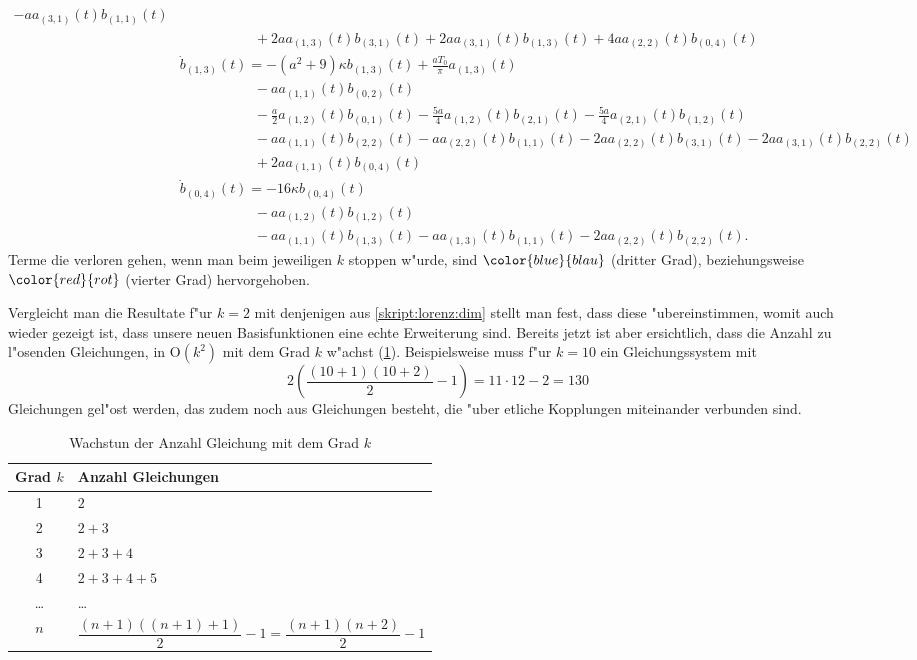 \begin{align*}
-
a
a_{(3,1)}(t) b_{(1,1)}(t)
\\
&\phantom{aaaaaaaaaa}
+
2 a
a_{(1,3)}(t) b_{(3,1)}(t)
+
2 a
a_{(3,1)}(t) b_{(1,3)}(t)
+
4 a
a_{(2,2)}(t) b_{(0,4)}(t)
\\
&
\dot{b}_{(1,3)}(t)
=
-
(a^2+9)
\kappa
b_{(1,3)}(t)
+
\frac{a T_{0}}{\pi} a_{(1,3)}(t)
\\
&\phantom{aaaaaaaaaa}
-
a
a_{(1,1)}(t) b_{(0,2)}(t)
\\
&\phantom{aaaaaaaaaa}
-
\frac{a}{2} a_{(1,2)}(t) b_{(0,1)}(t)
-
\frac{5 a}{4} a_{(1,2)}(t) b_{(2,1)}(t)
-
\frac{5 a}{4} a_{(2,1)}(t) b_{(1,2)}(t)
\\
&\phantom{aaaaaaaaaa}
-
a
a_{(1,1)}(t) b_{(2,2)}(t)
-
a
a_{(2,2)}(t) b_{(1,1)}(t)
-
2 a
a_{(2,2)}(t) b_{(3,1)}(t)
-
2 a
a_{(3,1)}(t) b_{(2,2)}(t)
\\
&\phantom{aaaaaaaaaa}
+
2 a
a_{(1,1)}(t) b_{(0,4)}(t)
\\
&
\dot{b}_{(0,4)}(t)
=
-
16
\kappa
b_{(0,4)}(t)
\\
&\phantom{aaaaaaaaaa}
-
a
a_{(1,2)}(t) b_{(1,2)}(t)
\\
&\phantom{aaaaaaaaaa}
-
a
a_{(1,1)}(t) b_{(1,3)}(t)
-
a
a_{(1,3)}(t) b_{(1,1)}(t)
-
2a
a_{(2,2)}(t) b_{(2,2)}(t).
\end{align*}
Terme die verloren gehen, wenn man beim jeweiligen $k$ stoppen w"urde, sind 
$\color{blue}{blau}$ (dritter Grad), beziehungsweise $\color{red}{rot}$ 
(vierter Grad) hervorgehoben.

Vergleicht man die Resultate f"ur $k = 2$ mit denjenigen aus 
\cref{skript:lorenz:dim} stellt man fest, dass diese "ubereinstimmen, womit 
auch wieder gezeigt ist, dass unsere neuen Basisfunktionen eine echte 
Erweiterung sind. Bereits jetzt ist aber ersichtlich, dass die Anzahl 
zu l"osenden Gleichungen, in $\text{O}(k^2)$ mit dem Grad $k$ w"achst 
(\cref{table:lorenz2:degree}). Beispielsweise muss f"ur $k = 10$ ein 
Gleichungssystem mit
\begin{equation*}
	2\left(\frac{(10 + 1)(10 + 2)}{2} - 1\right) = 11 \cdot 12 - 2 = 130
\end{equation*}
Gleichungen gel"ost werden, das zudem noch aus Gleichungen besteht, die "uber 
etliche Kopplungen miteinander verbunden sind.

\begin{table}
	\centering
	\begin{tabular}{c | l}
		Grad $k$ & Anzahl Gleichungen \\
		\hline
		1 & $2$ \\
		2 & $2 + 3$ \\
		3 & $2 + 3 + 4$\\
		4 & $2 + 3 + 4 + 5$\\
		\dots & \dots \\
		$n$ & $\dfrac{(n + 1)((n + 1) + 1)}{2} - 1
		= \dfrac{(n + 1)(n + 2)}{2} - 1$
	\end{tabular}
	\caption{Wachstun der Anzahl Gleichung mit dem Grad $k$}
	\label{table:lorenz2:degree}
\end{table}
